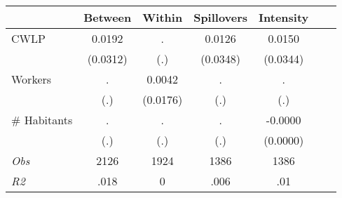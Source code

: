 \begin{tabular}{l*{6}{c}}\hline&\multicolumn{1}{c}{Between}&\multicolumn{1}{c}{Within}&\multicolumn{1}{c}{Spillovers}&\multicolumn{1}{c}{Intensity}\\ \hline 
CWLP & 0.0192 & . & 0.0126 & 0.0150 \\
 & (0.0312) & (.) & (0.0348) & (0.0344) \\
Workers & . & 0.0042 & . & . \\
 & (.) & (0.0176) & (.) & (.) \\
\# Habitants & . & . & . & -0.0000 \\
  & (.) & (.) & (.) & (0.0000) \\
\hline \textit{Obs} & 2126 & 1924 & 1386 & 1386  \\ \textit{R2} & .018 & 0 & .006 & .01 \\ \hline \end{tabular}
